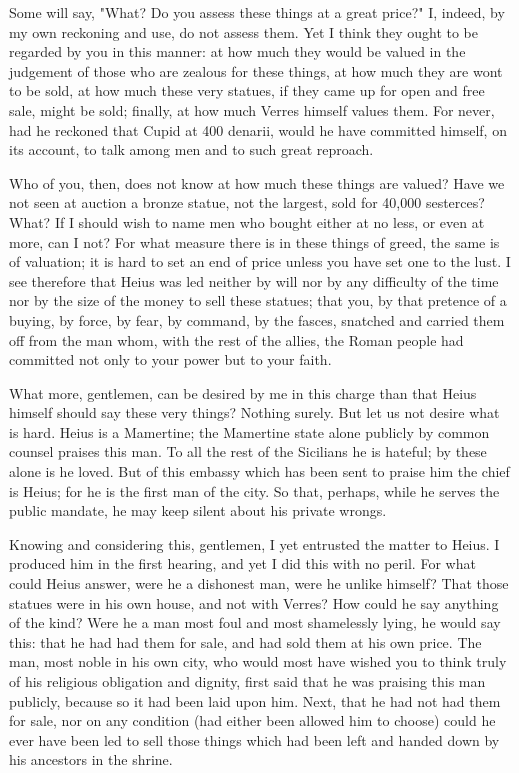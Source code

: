  Some will say, "What? Do you assess these things at a great price?" I, indeed, by my own reckoning and use, do not assess them. Yet I think they ought to be regarded by you in this manner: at how much they would be valued in the judgement of those who are zealous for these things, at how much they are wont to be sold, at how much these very statues, if they came up for open and free sale, might be sold; finally, at how much Verres himself values them. For never, had he reckoned that Cupid at 400 denarii, would he have committed himself, on its account, to talk among men and to such great reproach.

 Who of you, then, does not know at how much these things are valued? Have we not seen at auction a bronze statue, not the largest, sold for 40,000 sesterces? What? If I should wish to name men who bought either at no less, or even at more, can I not? For what measure there is in these things of greed, the same is of valuation; it is hard to set an end of price unless you have set one to the lust. I see therefore that Heius was led neither by will nor by any difficulty of the time nor by the size of the money to sell these statues; that you, by that pretence of a buying, by force, by fear, by command, by the fasces, snatched and carried them off from the man whom, with the rest of the allies, the Roman people had committed not only to your power but to your faith.

 What more, gentlemen, can be desired by me in this charge than that Heius himself should say these very things? Nothing surely. But let us not desire what is hard. Heius is a Mamertine; the Mamertine state alone publicly by common counsel praises this man. To all the rest of the Sicilians he is hateful; by these alone is he loved. But of this embassy which has been sent to praise him the chief is Heius; for he is the first man of the city. So that, perhaps, while he serves the public mandate, he may keep silent about his private wrongs.

 Knowing and considering this, gentlemen, I yet entrusted the matter to Heius. I produced him in the first hearing, and yet I did this with no peril. For what could Heius answer, were he a dishonest man, were he unlike himself? That those statues were in his own house, and not with Verres? How could he say anything of the kind? Were he a man most foul and most shamelessly lying, he would say this: that he had had them for sale, and had sold them at his own price. The man, most noble in his own city, who would most have wished you to think truly of his religious obligation and dignity, first said that he was praising this man publicly, because so it had been laid upon him. Next, that he had not had them for sale, nor on any condition (had either been allowed him to choose) could he ever have been led to sell those things which had been left and handed down by his ancestors in the shrine.

